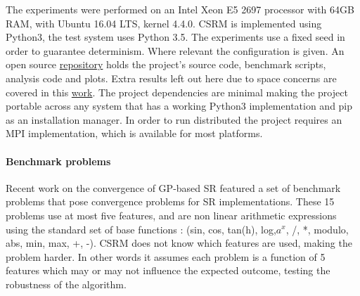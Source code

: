 The experiments were performed on an Intel Xeon E5 2697 processor with 64GB RAM, with Ubuntu 16.04 LTS, kernel 4.4.0.
CSRM is implemented using Python3, the test system uses Python 3.5. 
The experiments use a fixed seed in order to guarantee determinism. Where relevant the configuration is given. 
An open source \href{https://bitbucket.org/bcardoen/csrm}{repository} holds the project's source code, benchmark scripts, analysis code and plots. Extra results left out here due to space concerns are covered in this \href{https://bitbucket.org/bcardoen/csrm/src/9de4b990ce27bbaeb885203f82a76635d8d92473/thesis/thesis/MsCThesisBenCardoen.pdf?at=master&fileviewer=file-view-default}{work}. The project dependencies are minimal making the project portable across any system that has a working Python3 implementation and pip as an installation manager. In order to run distributed the project requires an MPI implementation, which is available for most platforms.
\paragraph{Benchmark problems}
Recent work on the convergence of GP-based SR \cite{SRAccur, SRBaseline} featured a set of benchmark problems that pose convergence problems for SR implementations. 
These 15 problems use at most five features, and are non linear arithmetic expressions using the standard set of base functions : (sin, cos, tan(h), log,$a^x$, /, *, modulo, abs, min, max, +, -). CSRM does not know which features are used, making the problem harder. In other words it assumes each problem is a function of 5 features which may or may not influence the expected outcome, testing the robustness of the algorithm.
